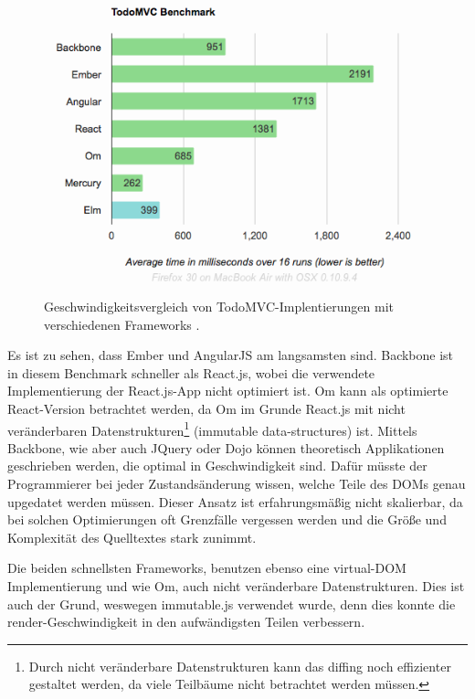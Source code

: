 \documentclass[12pt,twoside]{book}
\begin{document}
\begin{figure}[htbp]
    \centering
    \includegraphics[width=1.0\textwidth]{images/virtual_dom.png}
    \caption{Geschwindigkeitsvergleich von TodoMVC-Implentierungen mit verschiedenen Frameworks \cite{elm}.}
    \label{fig:elm}
\end{figure}

Es ist zu sehen, dass Ember und AngularJS am langsamsten sind. Backbone ist in diesem Benchmark schneller als React.js, wobei die verwendete Implementierung der React.js-App nicht optimiert ist. Om\cite{om} kann als optimierte React-Version betrachtet werden, da Om im Grunde React.js mit nicht veränderbaren Datenstrukturen\footnote{Durch nicht veränderbare Datenstrukturen kann das diffing noch effizienter gestaltet werden, da viele Teilbäume nicht betrachtet werden müssen.} (immutable data-structures) ist. Mittels Backbone, wie aber auch JQuery oder Dojo können theoretisch Applikationen geschrieben werden, die optimal in Geschwindigkeit sind. Dafür müsste der Programmierer bei jeder Zustandsänderung wissen, welche Teile des DOMs genau upgedatet werden müssen. Dieser Ansatz ist erfahrungsmäßig nicht skalierbar, da bei solchen Optimierungen oft Grenzfälle vergessen werden und die Größe und Komplexität des Quelltextes stark zunimmt.

Die beiden schnellsten Frameworks, benutzen ebenso eine virtual-DOM Implementierung und wie Om, auch nicht veränderbare Datenstrukturen.
Dies ist auch der Grund, weswegen immutable.js\cite{Immutable} verwendet wurde, denn dies konnte die render-Geschwindigkeit in den aufwändigsten Teilen verbessern.
\end{document}
